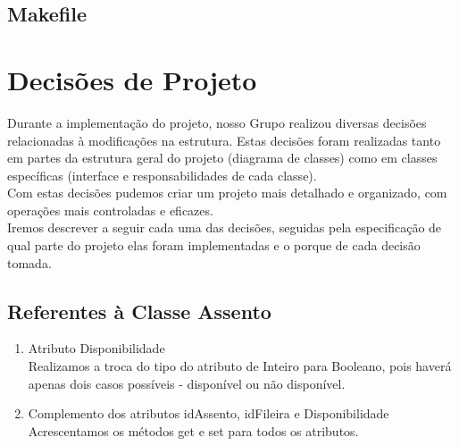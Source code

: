 \documentclass[a4paper]{article}
\begin{document}
\subsection{Makefile}


\pagebreak

\section{Decisões de Projeto}
\hspace{5 mm}Durante a implementação do projeto, nosso Grupo realizou diversas decisões relacionadas à modificações na estrutura. Estas decisões foram realizadas tanto em partes da estrutura geral do projeto (diagrama de classes) como em classes específicas (interface e responsabilidades de cada classe).\\
\quad{\null}\hspace{5 mm}Com estas decisões pudemos criar um projeto mais detalhado e organizado, com operações mais controladas e eficazes.\\
\quad{\null}\hspace{5 mm}Iremos descrever a seguir cada uma das decisões, seguidas pela especificação de qual parte do projeto elas foram implementadas e o porque de cada decisão tomada.

\subsection{Referentes à Classe Assento}
\begin{enumerate}

\item{Atributo Disponibilidade}\\
Realizamos a troca do tipo do atributo de Inteiro para Booleano, pois haverá apenas dois casos possíveis - disponível ou não disponível.

\item{Complemento dos atributos idAssento, idFileira e Disponibilidade}\\
Acrescentamos os métodos get e set para todos os atributos.

\end{enumerate}
\end{document}
